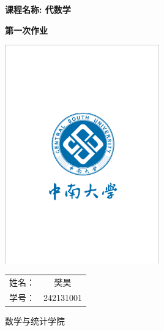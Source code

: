 

\begin{titlepage}
    \centering %


    {\Large\bfseries 课程名称: 代数学 \par}
    \vspace{1.5cm}

    {\Huge\bfseries 第一次作业 \par}
    \vspace{2cm}

    \includegraphics[width=0.5\textwidth, trim={3cm 5cm 3cm 5cm}, clip]{picture/csu.pdf}
    
    {\Large
    \begin{tabular}{lc}
        姓名： & 樊昊 \\
        学号： & 242131001 \\
    \end{tabular}
    }    
    
    \vfill %

    {\large 数学与统计学院 \par}
\end{titlepage}